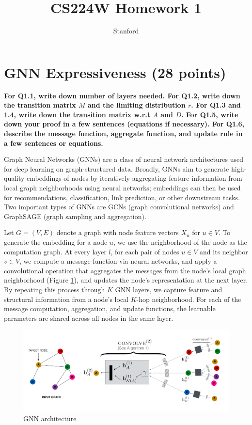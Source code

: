 \documentclass{article}
\title{CS224W Homework 1}
\author{Stanford}
\numberwithin{figure}{section}
\begin{document}
\maketitle


\section{GNN Expressiveness (28 points)}


\textbf{ For Q1.1, write down number of layers needed. For Q1.2, write down the transition matrix $M$ and the limiting distribution $r$. For Q1.3 and 1.4, write down the transition matrix w.r.t $A$ and $D$. For Q1.5, write down your proof in a few sentences (equations if necessary). For Q1.6, describe the message function, aggregate function, and update rule in a few sentences or equations.}

Graph Neural Networks (GNNs) are a class of neural network architectures used for deep learning on graph-structured data. Broadly, GNNs aim to generate high-quality embeddings of nodes by iteratively aggregating feature information from local graph neighborhoods using neural networks; embeddings can then be used for recommendations, classification, link prediction, or other downstream tasks. Two important types of GNNs are GCNs (graph convolutional networks) and GraphSAGE (graph sampling and aggregation).

Let $G = (V,E)$ denote a graph with node feature vectors $X_u$ for $u \in V$. To generate the embedding for a node $u$, we use the neighborhood of the node as the computation graph. At every layer $l$, for each pair of nodes $u \in V$ and its neighbor $v \in V$, we compute a message function via neural networks, and apply a convolutional operation that aggregates the messages from the node’s local graph neighborhood (Figure \ref{fig:Q4-gnn-architecture}), and updates the node’s representation at the next layer. By repeating this process through $K$ GNN layers, we capture feature and structural information from a node’s local $K$-hop neighborhood. For each of the message computation, aggregation, and update functions, the learnable parameters are shared across all nodes in the same layer.

\begin{figure}[!htb]
\centering
  \includegraphics[width=0.7\columnwidth]{CS224W_Homework1/gnn-architecture.png}
  \caption{GNN architecture}   
  \label{fig:Q4-gnn-architecture}
\end{figure}
\end{document}
